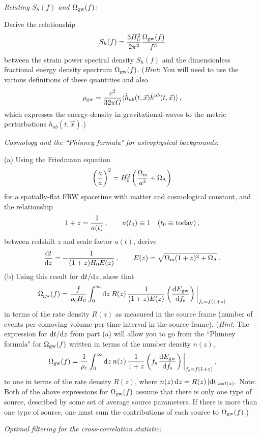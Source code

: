 \documentclass[11pt]{article}
\numberwithin{equation}{section}
\def\be{\begin{equation}}
\def\ee{\end{equation}}
\def\i{\item{}}
\def\D{{\rm d}}
\begin{document}
\i {\em Relating $S_h(f)$ and $\Omega_{\rm gw}(f)$:}
\label{exer:2}

Derive the relationship 
\be
S_h(f) = \frac{3 H_0^2}{2\pi^2}\frac{\Omega_{\rm gw}(f)}{f^3}
\ee
between the strain power spectral density $S_h(f)$ and the 
dimensionless fractional energy density spectrum $\Omega_{\rm gw}(f)$.
({\em Hint}: You will need to use the various definitions of these
quantities and also 
\be
\rho_{\rm gw} =\frac{c^2}{32\pi G}\langle \dot h_{ab}(t,\vec x)\dot h^{ab}(t,\vec x)\rangle\,,
\ee
which expresses the energy-density in gravitational-waves to 
the metric perturbations $h_{ab}(t,\vec x)$.)

\i {\em Cosmology and the ``Phinney formula" for astrophysical backgrounds:}
\label{exer:3}

(a) Using the Friedmann equation
%
\be
\left(\frac{\dot a}{a}\right)^2
=H_0^2\left(\frac{\Omega_{\rm m}}{a^{3}} + \Omega_\Lambda\right)
\ee
%
for a spatially-flat FRW spacetime with matter and 
cosmological constant, and the relationship 
%
\be
1+z = \frac{1}{a(t)}\,,
\qquad a(t_0)\equiv 1\quad(t_0\equiv {\rm today})\,,
\ee
%
between redshift $z$ and scale factor $a(t)$,
derive 
%
\be
\frac{\D t}{\D z} =-\frac{1}{(1+z)H_0 E(z)}\,,
\qquad
E(z) = \sqrt{\Omega_{\rm m}(1+z)^3 + \Omega_\Lambda}\,.
\ee
%
(b) Using this result for $\D t/\D z$, show that 
%
\be
\Omega_{\rm gw}(f)= \frac{f}{\rho_{\rm c}H_0}
\int_0^\infty \D z\>R(z)\,\frac{1}{(1+z)E(z)}
\left(\frac{\D E_{\rm gw}}{\D f_{\rm s}}\right)\bigg|_{f_{\rm s}=f(1+z)}
\ee
%
in terms of the rate density $R(z)$ as measured in 
the source frame 
(number of events per comoving volume per time interval
in the source frame).
({\em Hint}: The expression for $\D t/\D z$ from part
(a) will allow 
you to go from the ``Phinney formula" for
$\Omega_{\rm gw}(f)$ written in terms of the number 
density $n(z)$,
%
\be
\Omega_{\rm gw}(f)= \frac{1}{\rho_c}\int_0^\infty \D z\>
n(z)\,\frac{1}{1+z}\left(f_{\rm s}\,
\frac{\D E_{\rm gw}}{\D f_{\rm s}}\right)\bigg|_{f_{\rm s}=f(1+z)}\,,
\ee
%
to one in terms of the rate density 
$R(z)$, where $n(z)\,\D z=R(z)\,|\D t|_{t=t(z)}$.
Note: Both of the above expressions for $\Omega_{\rm gw}(f)$
assume that there is only one type of source, described by 
some set of average source parameters.  
If there is more than one type of source, one must sum
the contributions of each source to $\Omega_{\rm gw}(f)$.)

\i {\em Optimal filtering for the cross-correlation statistic:}
\label{exer:4}
\end{document}
